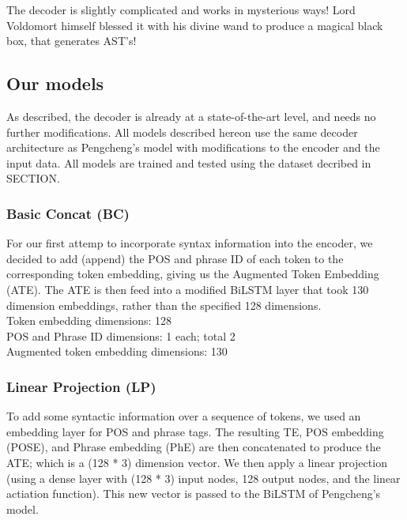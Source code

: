 \documentclass{IEEEtran}
\begin{document}
      The decoder is slightly complicated and works in mysterious ways! Lord Voldomort himself
      blessed it with his divine wand to produce a magical black box, that generates
      AST's! \\

      \blindtext

      \subsection{Our models}
      As described, the decoder is already at a state-of-the-art level, and needs no further 
      modifications. All models described hereon use the same decoder architecture as Pengcheng's 
      model with modifications to the encoder and the input data. All models are trained and 
      tested using the dataset decribed in SECTION. %

      \subsubsection{Basic Concat (BC)}
      For our first attemp to incorporate syntax information into the encoder, we decided to 
      add (append) the POS and phrase ID of each token to the corresponding token embedding, 
      giving us the Augmented Token Embedding (ATE). The ATE is then feed into a modified BiLSTM
      layer that took 130 dimension embeddings, rather than the specified 128 dimensions. \\

      \hspace*{-4mm}Token embedding dimensions: 128 \\
      POS and Phrase ID dimensions: 1 each; total 2 \\
      Augmented token embedding dimensions: 130 \\

      \subsubsection{Linear Projection (LP)}
      To add some syntactic information over a sequence of tokens, we used an embedding layer for
      POS and phrase tags. The resulting TE, POS embedding (POSE), and Phrase embedding (PhE) are
      then concatenated to produce the ATE; which is a (128 * 3) dimension vector. We then
      apply a linear projection (using a dense layer with (128 * 3) input nodes, 128 output nodes,
      and the linear actiation function). This new vector is passed to the BiLSTM of Pengcheng's
      model. \\
\end{document}

